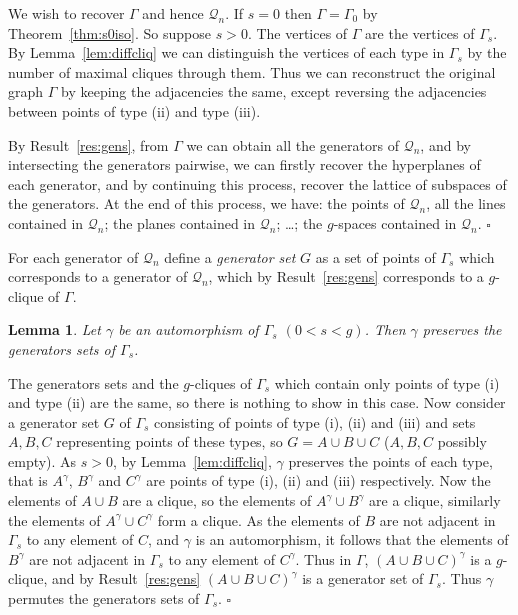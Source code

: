 \documentclass[12pt]{article}
\newtheorem{lemma}[theorem]{Lemma}
\newenvironment{proof}{\noindent{\bf Proof}\hspace{0.5em}}
    { \null  \hfill $\square$ \par}
\newcommand{\Q}{\mathscr Q}
\newcommand{\Label}{\label}
\begin{document}
\begin{proof}
We wish to recover $\Gamma$ and hence $\Q_n$.  If $s=0$ then $\Gamma=\Gamma_0$ by Theorem~\ref{thm:s0iso}. So suppose $s>0$. The vertices of $\Gamma$ are the vertices of $\Gamma_s$.  By Lemma~\ref{lem:diffcliq}  we can distinguish the vertices of each type in $\Gamma_s$ by the number of maximal cliques through them.  Thus we can reconstruct the original graph $\Gamma$ by  keeping the adjacencies the same, except reversing the adjacencies between points of type (ii) and type (iii).  

By Result~\ref{res:gens}, from $\Gamma$ we can obtain all the generators of $\Q_n$, and by intersecting the generators pairwise, we can firstly recover the hyperplanes of each generator, and by continuing this process, recover the lattice of subspaces of the generators. At the end of this process, we have: the points of $\Q_n$, all the lines contained in $\Q_n$; the planes contained in $\Q_n$; \dots; the $g$-spaces contained in $\Q_n$. 
\end{proof}

For each generator of $\Q_n$ define a \emph{generator set} $G$ as a set of points of $\Gamma_s$ which corresponds to a generator of $\Q_n$, which by Result~\ref{res:gens} corresponds to a $g$-clique of $\Gamma$.



\begin{lemma}\Label{per-gen}
Let $\gamma$ be an automorphism of $\Gamma_s$ $(0<s<g)$.  Then $\gamma$ preserves the generators sets of $\Gamma_s$.
\end{lemma}
\begin{proof}
The generators sets and the $g$-cliques of $\Gamma_s$ which contain only points of type (i) and type (ii) are the same, so there is nothing to show in this case.  Now consider a generator set $G$ of $\Gamma_s$ consisting of points of type (i), (ii) and (iii) and sets $A,B,C$ representing points of these types, so $G=A\cup B\cup C$ ($A,B,C$ possibly empty).  As $s>0$, by Lemma~\ref{lem:diffcliq}, $\gamma$ preserves the points of each type, that is $A^\gamma$, $B^\gamma$ and $C^\gamma$ are points of type (i), (ii) and (iii) respectively. Now the elements of $A\cup B$ are a clique, so the elements of $A^\gamma\cup B^\gamma$ are a clique, similarly the elements of $A^\gamma\cup C^\gamma$ form a clique.  As the elements of $B$ are not adjacent in $\Gamma_s$ to any element of $C$, and $\gamma$ is an automorphism,  it follows that the elements of $B^\gamma$ are not adjacent in $\Gamma_s$ to any element of $C^\gamma$.  Thus in $\Gamma$, $(A\cup B\cup C)^\gamma$ is a $g$-clique, and by Result~\ref{res:gens} $(A\cup B\cup C)^\gamma$ is a generator set of $\Gamma_s$.  Thus $\gamma$ permutes the  generators sets of $\Gamma_s$.
\end{proof}
\end{document}
